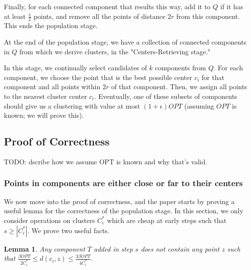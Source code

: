 \documentclass[paper=a4, fontsize=10.5pt]{scrartcl} %
\numberwithin{equation}{section} %
\numberwithin{figure}{section} %
\numberwithin{table}{section} %
\newtheorem{lemma}[theorem]{Lemma}
\begin{document}
Finally, for each connected component that results this way, add it to $Q$ if it has at least $\frac{s}{2}$ points, and remove all the points of distance $2r$ from this component.  This ends the population stage.


At the end of the population stage, we have a collection of connected components in $Q$ from which we derive clusters, in the "Centers-Retrieving stage."

In this stage, we continually select candidates of $k$ components from $Q$.  For each component, we choose the point that is the best possible center $c_i$ for that component and all points within $2r$ of that component.  Then, we assign all points to the nearest cluster center $c_i$.  Eventually, one of these subsets of components should give us a clustering with value at most $(1 + \epsilon) OPT$ (assuming $OPT$ is known; we will prove this).

\subsection{Proof of Correctness}

TODO: dscribe how we assume OPT is known and why that's valid.

\subsubsection{Points in components are either close or far to their centers}
We now move into the proof of correctness, and the paper starts by proving a useful lemma for the correctness of the population stage.  In this section, we only consider operations on clusters $C^*_i$ which are cheap at early steps such that $s \geq |C^*_i|$.  We prove two useful facts.

\begin{lemma}
Any component $T$ added in step $s$ does not contain any point $z$ such that $\frac{\beta OPT}{2 C^*_i} \leq  d(c_i, z) \leq \frac{3 \beta OPT}{4 C^*_i}$.
\label{lemma:4.2a}
\end{lemma}
\end{document}

